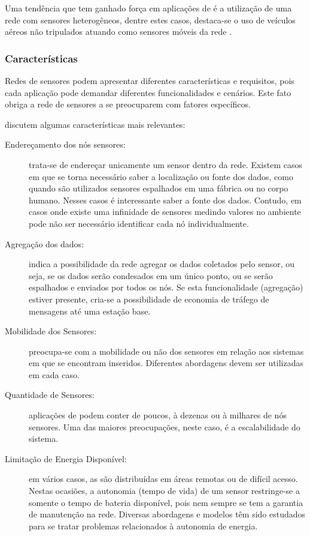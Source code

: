 Uma tendência que tem ganhado força em aplicações de \rssf é a utilização de uma rede com sensores heterogêneos, dentre estes casos, destaca-se o uso de veículos aéreos não tripulados atuando como sensores móveis da rede \cite{Freitas2009}. 


\subsubsection{Características}
Redes de sensores podem apresentar diferentes características e requisitos, pois cada aplicação pode demandar diferentes funcionalidades e cenários.
Este fato obriga a rede de sensores a se preocuparem com fatores específicos.

\cite{Loureiro} discutem algumas características mais relevantes:

\begin{description}
	\item[Endereçamento dos nós sensores:] trata-se de endereçar unicamente um sensor dentro da rede. Existem casos em que se torna necessário saber a localização ou fonte dos dados, como quando são utilizados sensores espalhados em uma fábrica ou no corpo humano. Nesses casos é interessante saber a fonte dos dados. Contudo, em casos onde existe uma infinidade de sensores medindo valores no ambiente pode não ser necessário identificar cada nó individualmente.

	\item[Agregação dos dados:] indica a possibilidade da rede agregar os dados coletados pelo sensor, ou seja, se os dados serão condesados em um único ponto, ou se serão espalhados e enviados por todos os nós. Se esta funcionalidade (agregação) estiver presente, cria-se a possibilidade de economia de tráfego de mensagens até uma estação base.

	\item[Mobilidade dos Sensores: ] preocupa-se com a mobilidade ou não dos sensores em relação aos sistemas em que se encontram inseridos. Diferentes abordagens devem ser utilizadas em cada caso. 

	\item[Quantidade de Sensores:] aplicações de \rssf podem conter de poucos, à dezenas ou à milhares de nós sensores. Uma das maiores preocupações, neste caso, é a escalabilidade do sistema.
	
	\item[Limitação de Energia Disponível: ] em vários casos, as \rssfs são distribuídas em áreas remotas ou de difícil acesso. Nestas ocasiões, a autonomia (tempo de vida) de um sensor restringe-se a somente o tempo de bateria disponível, pois nem sempre se tem a garantia de manutenção na rede. Diversas abordagens e modelos têm sido estudados para se tratar problemas relacionados à autonomia de energia.


\end{description}
